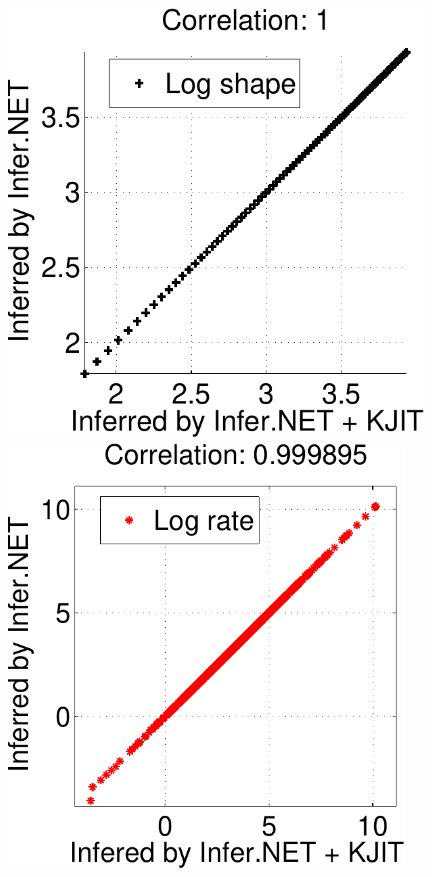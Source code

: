\documentclass[25pt, a0paper, portrait, margin=0mm, innermargin=10mm,
     blockverticalspace=7mm, colspace=8mm, subcolspace=8mm]{tikzposter} %
\begin{document}
\begin{columns}
{  %
%
\begin{tikzfigure}
  \centering
  \includegraphics[width=11cm]{online/cg_post_shape-crop}
  \hspace{1.8cm}
  \includegraphics[width=10.5cm]{online/cg_post_rate-crop}

\end{tikzfigure}}
\end{columns}
\end{document}

